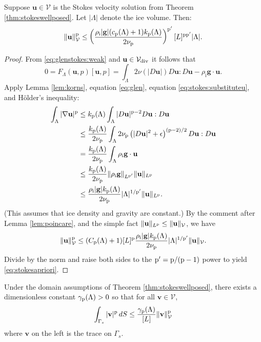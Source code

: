 \documentclass[hidelinks,onefignum,onetabnum,final]{siamart220329}  %
\newcommand{\eps}{\epsilon}
\newcommand{\grad}{\nabla}
\newcommand{\bg}{\mathbf{g}}
\newcommand{\bu}{\mathbf{u}}
\newcommand{\bv}{\mathbf{v}}
\newcommand{\cV}{\mathcal{V}}
\newcommand{\pp}{{\text{\textnormal{p}}}}
\newcommand{\rhoi}{\rho_{\text{i}}}
\newcommand{\Vdiv}{\cV_{\text{\textnormal{div}}}}
\begin{document}
\begin{lemma} \label{lem:stokesapriori}
Suppose $\bu\in\cV$ is the Stokes velocity solution from Theorem \ref{thm:stokeswellposed}.  Let $|\Lambda|$ denote the ice volume.  Then:
\begin{equation}
\|\bu\|_{\cV}^\pp \le \left(\frac{\rhoi |\bg| (c_{\pp}(\Lambda) + 1) k_{\pp}(\Lambda)}{2 \nu_\pp}\right)^{\pp'} [L]^{\pp\pp'} |\Lambda|. \label{eq:stokesapriori}
\end{equation}

\end{lemma}

\begin{proof}
From \eqref{eq:glenstokes:weak} and $\bu \in\Vdiv$ it follows that
\begin{equation}
0= F_\Lambda(\bu,p)[\bu,p] = \int_\Lambda 2 \nu(|D\bu|) D\bu : D\bu - \rhoi \bg \cdot \bu.  \label{eq:stokes:substituteu}
\end{equation}
Apply Lemma \ref{lem:korns}, equation \eqref{eq:glen}, equation \eqref{eq:stokes:substituteu}, and H\"older's inequality:
\begin{align}
\int_\Lambda |\grad\bu|^\pp &\le k_{\pp}(\Lambda) \int_\Lambda |D\bu|^{\pp-2} D\bu:D\bu \label{eq:stokes:workapriori} \\
	&\le \frac{k_{\pp}(\Lambda)}{2 \nu_\pp} \int_\Lambda 2 \nu_\pp \left(|D\bu|^2 + \eps\right)^{(\pp-2)/2} D\bu:D\bu \notag \\
	&= \frac{k_{\pp}(\Lambda)}{2 \nu_\pp} \int_\Lambda \rhoi \bg \cdot \bu \notag \\
	&\le \frac{k_{\pp}(\Lambda)}{2 \nu_\pp} \|\rhoi \bg\|_{L^{\pp'}} \|\bu\|_{L^\pp} \notag \\
	&\le \frac{\rhoi |\bg| k_{\pp}(\Lambda)}{2 \nu_\pp} |\Lambda|^{1/\pp'} \|\bu\|_{L^\pp}. \notag
\end{align}
(This assumes that ice density and gravity are constant.)  By the comment after Lemma \ref{lem:poincare}, and the simple fact $\|\bu\|_{L^\pp} \le \|\bu\|_{\cV}$, we have
\begin{align*}
\|\bu\|_{\cV}^\pp \le (C_{\pp}(\Lambda) + 1) [L]^\pp \frac{\rhoi |\bg| k_{\pp}(\Lambda)}{2 \nu_\pp} |\Lambda|^{1/\pp'} \|\bu\|_{\cV}.
\end{align*}
Divide by the norm and raise both sides to the $\pp' = \pp/(\pp-1)$ power to yield \eqref{eq:stokesapriori}.
\end{proof}

\begin{lemma} \label{lem:trace}
Under the domain assumptions of Theorem \ref{thm:stokeswellposed}, there exists a dimensionless constant $\gamma_{\pp}(\Lambda)>0$ so that for all $\bv \in \cV$,
\begin{equation}
\int_{\Gamma_s} |\bv|^\pp \,dS \le \frac{\gamma_{\pp}(\Lambda)}{[L]} \|\bv\|_{\cV}^\pp \label{eq:trace}
\end{equation}
where $\bv$ on the left is the trace on $\Gamma_s$.
\end{lemma}
\end{document}
